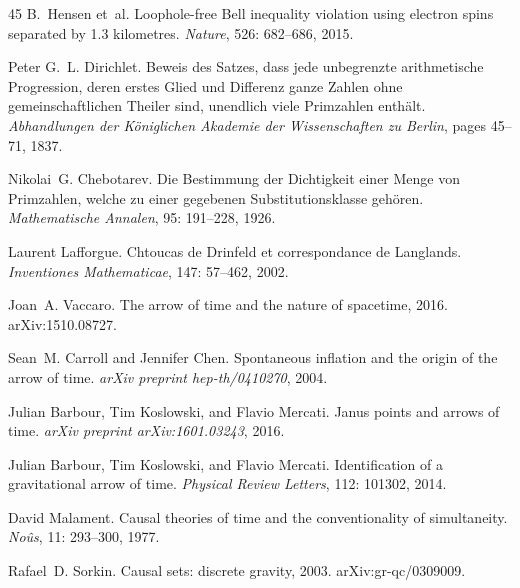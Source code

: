 \documentclass[11pt,a4paper]{article}
\theoremstyle{plain}
\theoremstyle{definition}
\theoremstyle{remark}
\begin{document}
\begin{thebibliography}{45}
B.~Hensen et~al.
\newblock Loophole-free {B}ell inequality violation using electron spins
  separated by 1.3 kilometres.
\newblock \emph{Nature}, 526: 682--686, 2015.

Peter G.~L. Dirichlet.
\newblock Beweis des {S}atzes, dass jede unbegrenzte arithmetische
  {P}rogression, deren erstes {G}lied und {D}ifferenz ganze {Z}ahlen ohne
  gemeinschaftlichen {T}heiler sind, unendlich viele {P}rimzahlen enth{\"a}lt.
\newblock \emph{Abhandlungen der K{\"o}niglichen Akademie der Wissenschaften zu
  Berlin}, pages 45--71, 1837.

Nikolai~G. Chebotarev.
\newblock Die {B}estimmung der {D}ichtigkeit einer {M}enge von {P}rimzahlen,
  welche zu einer gegebenen {S}ubstitutionsklasse geh{\"o}ren.
\newblock \emph{Mathematische Annalen}, 95: 191--228, 1926.

Laurent Lafforgue.
\newblock Chtoucas de {D}rinfeld et correspondance de {L}anglands.
\newblock \emph{Inventiones Mathematicae}, 147: 57--462, 2002.

Joan~A. Vaccaro.
\newblock The arrow of time and the nature of spacetime, 2016.
\newblock arXiv:1510.08727.

Sean~M. Carroll and Jennifer Chen.
\newblock Spontaneous inflation and the origin of the arrow of time.
\newblock \emph{arXiv preprint hep-th/0410270}, 2004.

Julian Barbour, Tim Koslowski, and Flavio Mercati.
\newblock Janus points and arrows of time.
\newblock \emph{arXiv preprint arXiv:1601.03243}, 2016.

Julian Barbour, Tim Koslowski, and Flavio Mercati.
\newblock Identification of a gravitational arrow of time.
\newblock \emph{Physical Review Letters}, 112: 101302, 2014.

David Malament.
\newblock Causal theories of time and the conventionality of simultaneity.
\newblock \emph{No{\^u}s}, 11: 293--300, 1977.

Rafael~D. Sorkin.
\newblock Causal sets: discrete gravity, 2003.
\newblock arXiv:gr-qc/0309009.


\end{thebibliography}
\end{document}
